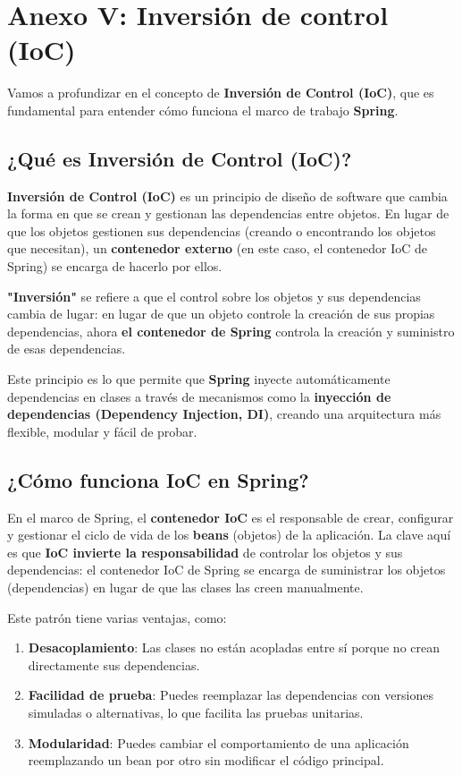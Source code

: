 \documentclass[11pt]{article}
\begin{document}
\section{Anexo V: Inversión de control (IoC)}
\label{sec:org96a75cd}
Vamos a profundizar en el concepto de \textbf{\textbf{Inversión de Control (IoC)}}, que es fundamental para entender cómo funciona el marco de trabajo \textbf{\textbf{Spring}}.

\subsection{¿Qué es Inversión de Control (IoC)?}
\label{sec:org62cd952}
\textbf{\textbf{Inversión de Control (IoC)}} es un principio de diseño de software que cambia la forma en que se crean y gestionan las dependencias entre objetos. En lugar de que los objetos gestionen sus dependencias (creando o encontrando los objetos que necesitan), un \textbf{\textbf{contenedor externo}} (en este caso, el contenedor IoC de Spring) se encarga de hacerlo por ellos.

\textbf{\textbf{"Inversión"}} se refiere a que el control sobre los objetos y sus dependencias cambia de lugar: en lugar de que un objeto controle la creación de sus propias dependencias, ahora \textbf{\textbf{el contenedor de Spring}} controla la creación y suministro de esas dependencias.

Este principio es lo que permite que \textbf{\textbf{Spring}} inyecte automáticamente dependencias en clases a través de mecanismos como la \textbf{\textbf{inyección de dependencias (Dependency Injection, DI)}}, creando una arquitectura más flexible, modular y fácil de probar.

\subsection{¿Cómo funciona IoC en Spring?}
\label{sec:org100421d}
En el marco de Spring, el \textbf{\textbf{contenedor IoC}} es el responsable de crear, configurar y gestionar el ciclo de vida de los \textbf{\textbf{beans}} (objetos) de la aplicación. La clave aquí es que \textbf{\textbf{IoC invierte la responsabilidad}} de controlar los objetos y sus dependencias: el contenedor IoC de Spring se encarga de suministrar los objetos (dependencias) en lugar de que las clases las creen manualmente.

Este patrón tiene varias ventajas, como:
\begin{enumerate}
\item \textbf{\textbf{Desacoplamiento}}: Las clases no están acopladas entre sí porque no crean directamente sus dependencias.
\item \textbf{\textbf{Facilidad de prueba}}: Puedes reemplazar las dependencias con versiones simuladas o alternativas, lo que facilita las pruebas unitarias.
\item \textbf{\textbf{Modularidad}}: Puedes cambiar el comportamiento de una aplicación reemplazando un bean por otro sin modificar el código principal.
\end{enumerate}
\end{document}
